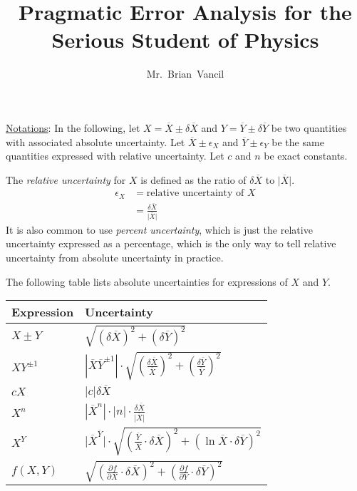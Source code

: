 \documentclass[12pt,twocolumn]{article}
\title{Pragmatic Error Analysis for the Serious Student of Physics}
\author{Mr.~Brian~Vancil}
\newcommand{\aX}{\overline X}
\newcommand{\aY}{\overline Y}
\newcommand{\dX}{\delta\overline X}
\newcommand{\dY}{\delta\overline Y}
\newcommand{\eX}{\epsilon_X}
\newcommand{\eY}{\epsilon_Y}
\newcommand{\quadrature}[2]{\sqrt{\left({#1}\right)^2+\left({#2}\right)^2}}
\begin{document}
\maketitle
\thispagestyle{empty}

\begin{mdframed}
\noindent
\underline{Notations}: In the following, let $X=\aX\pm\dX$ and $Y=\aY\pm\dY$ be two quantities with associated absolute uncertainty. Let $\aX\pm\eX$ and $\aY\pm\eY$ be the same quantities expressed with relative uncertainty. Let $c$ and $n$ be exact constants.
\end{mdframed}

\begin{mdframed}
\noindent The \emph{relative uncertainty} for $X$ is defined as the ratio of $\dX$ to $\lvert \aX\rvert$.
\begin{align}
\eX &= \text{relative uncertainty of }X \\
	&= \frac{\dX}{\lvert \aX\vert}
\end{align}
It is also common to use \emph{percent uncertainty}, which is just the relative uncertainty expressed as a percentage, which is the only way to tell relative uncertainty from absolute uncertainty in practice.
\end{mdframed}

\noindent The following table lists absolute uncertainties for expressions of $X$ and $Y$.

{\centering
\begin{tabular}{@{}l@{\quad$\pm$\quad}l@{}} \toprule
Expression & Uncertainty \\ \midrule
$X\pm Y$ 		& $\quadrature{\dX}{\dY}$ \\
$XY^{\pm1}$ 	& $\left\lvert \aX \aY^{\pm1}\right\rvert\cdot\quadrature{\frac{\dX}{\aX}}{\frac{\dY}{\aY}}$ \\
$cX$			& $\lvert c \rvert \dX $ \\
$X^n$			& $\left\lvert \aX^n\right\rvert\cdot\lvert n\rvert\cdot \frac{\dX}{\lvert \aX\rvert}$ \\
$X^Y$			& $\lvert \aX^{\aY}\rvert\cdot\quadrature{\frac{\aY}{\aX}\cdot\dX}{\ln \aX\cdot\dY}$ \\
$f(X,Y)$ 		& $\quadrature{\frac{\partial f}{\partial X}\cdot\dX}{\frac{\partial f}{\partial Y}\cdot\dY}$ \\
\bottomrule
\end{tabular}
}
\end{document}
